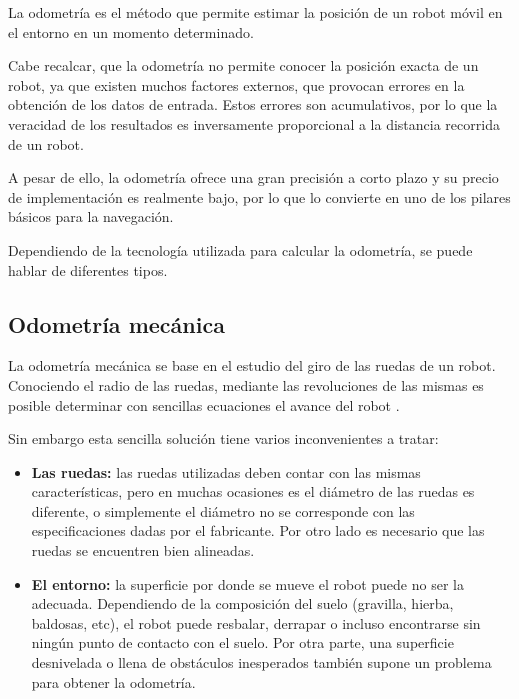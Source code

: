 

La odometría es el método que permite estimar la posición de un robot móvil en
el entorno en un momento determinado. 

Cabe recalcar, que la odometría no permite conocer la posición exacta de un
robot, ya que existen muchos factores externos, que provocan errores en la
obtención de los datos de entrada. Estos errores son acumulativos, por lo que
la veracidad de los resultados es inversamente proporcional a la distancia
recorrida de un robot.

A pesar de ello, la odometría ofrece una gran precisión a corto plazo y su
precio de implementación es realmente bajo, por lo que lo convierte en uno de
los pilares básicos para la navegación. 

Dependiendo de la tecnología utilizada para calcular la odometría, se puede 
hablar de diferentes tipos.

\subsection{Odometría mecánica}
La odometría mecánica se base en el estudio del giro de las ruedas de un robot.
Conociendo el radio de las ruedas, mediante las revoluciones de las mismas es
posible determinar con sencillas ecuaciones el avance del robot \cite{OdometriaMecanica}.

Sin embargo esta sencilla solución tiene varios inconvenientes a tratar:

\begin{itemize}
  \item \textbf{Las ruedas:} las ruedas utilizadas deben contar con las mismas
  características, pero en muchas ocasiones es el diámetro de las ruedas es
  diferente, o simplemente el diámetro no se corresponde con las
  especificaciones dadas por el fabricante. Por otro lado es necesario que las
  ruedas se encuentren bien alineadas.
  \item \textbf{El entorno:} la superficie por donde se mueve el robot puede no
  ser la adecuada. Dependiendo de la composición del suelo (gravilla, hierba,
  baldosas, etc), el robot puede resbalar, derrapar o incluso encontrarse sin
  ningún punto de contacto con el suelo. Por otra parte, una superficie
  desnivelada o llena de obstáculos inesperados también supone un problema para
  obtener la odometría.
\end{itemize}

